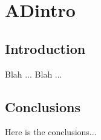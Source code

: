 \chapter{ADintro}
\label{chap:ADintro}

\section{Introduction}

Blah ... Blah ... 

\section{Conclusions}

Here is the conclusions...


\endinput







